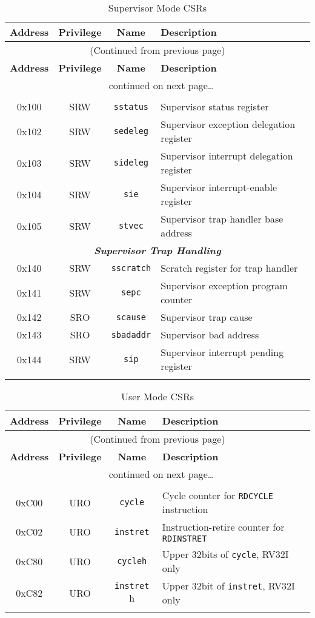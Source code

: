 \begin{longtable}[]{@{}cccl@{}}
\toprule
\textbf{Address} & \textbf{Privilege} & \textbf{Name} & \textbf{Description}\tabularnewline
\midrule
\endfirsthead
\multicolumn{4}{c}{{(Continued from previous page)}} \\
\toprule
\textbf{Address} & \textbf{Privilege} & \textbf{Name} & \textbf{Description}\tabularnewline
\midrule
\endhead
\midrule \multicolumn{4}{c}{{\tablename\ \thetable{} continued on next page\ldots}} \\
\endfoot
\endlastfoot

\multicolumn{4}{c}{\emph{\textbf{Supervisor Trap Handling}}}\tabularnewline
0x100 & SRW & \texttt{sstatus} & Supervisor status register\tabularnewline
0x102 & SRW & \texttt{sedeleg} & Supervisor exception delegation register\tabularnewline
0x103 & SRW & \texttt{sideleg} & Supervisor interrupt delegation register\tabularnewline
0x104 & SRW & \texttt{sie}     & Supervisor interrupt-enable register\tabularnewline
0x105 & SRW & \texttt{stvec}   & Supervisor trap handler base address\tabularnewline

\multicolumn{4}{c}{\emph{\textbf{Supervisor Trap Handling}}}\tabularnewline
0x140 & SRW & \texttt{sscratch} & Scratch register for trap handler\tabularnewline
0x141 & SRW & \texttt{sepc}     & Supervisor exception program counter\tabularnewline
0x142 & SRO & \texttt{scause}   & Supervisor trap cause\tabularnewline
0x143 & SRO & \texttt{sbadaddr} & Supervisor bad address\tabularnewline
0x144 & SRW & \texttt{sip}      & Supervisor interrupt pending register\tabularnewline
\bottomrule
\caption{Supervisor Mode CSRs}
\label{tab:supervisor-csrs}
\end{longtable}


\begin{longtable}[]{@{}cccl@{}}
\toprule
\textbf{Address} & \textbf{Privilege} & \textbf{Name} & \textbf{Description}\tabularnewline
\midrule
\endfirsthead
\multicolumn{4}{c}{{(Continued from previous page)}} \\
\toprule
\textbf{Address} & \textbf{Privilege} & \textbf{Name} & \textbf{Description}\tabularnewline
\midrule
\endhead
\midrule \multicolumn{4}{c}{{\tablename\ \thetable{} continued on next page\ldots}} \\
\endfoot
\endlastfoot

\multicolumn{4}{c}{\emph{\textbf{User Counter / Timers}}}\tabularnewline
0xC00 & URO & \texttt{cycle} & Cycle counter for \texttt{RDCYCLE} instruction\tabularnewline
0xC02 & URO & \texttt{instret} & Instruction-retire counter for \texttt{RDINSTRET}\tabularnewline
0xC80 & URO & \texttt{cycleh} & Upper 32bits of \texttt{cycle}, RV32I only\tabularnewline
0xC82 & URO & \texttt{instret} h& Upper 32bit of \texttt{instret}, RV32I only\tabularnewline
\bottomrule
\caption{User Mode CSRs}
\label{tab:user-csrs}
\end{longtable}

